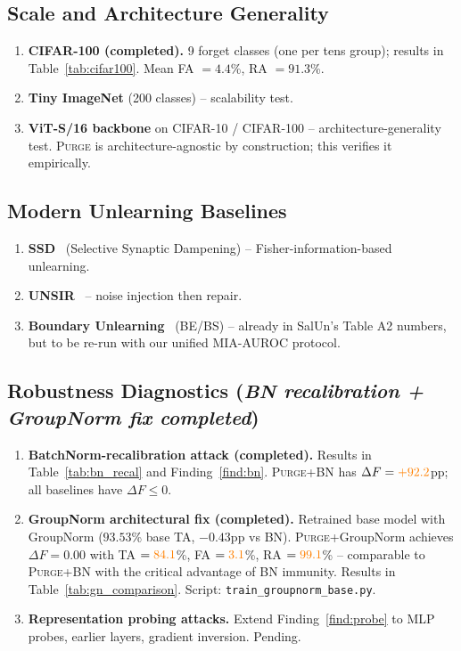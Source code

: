 \documentclass{article}
\newcommand{\ours}{\textsc{Purge}}
\newcommand{\new}[1]{{\color{orange}#1}}
\begin{document}
{\subsection{Scale and Architecture Generality}
\begin{enumerate}[nosep,leftmargin=*]
\item \new{\textbf{CIFAR-100 (completed).} 9 forget classes (one per tens group); results in Table~\ref{tab:cifar100}. Mean FA $= 4.4$\%, RA $= 91.3$\%.}
\item \textbf{Tiny ImageNet} (200 classes) -- scalability test.
\item \textbf{ViT-S/16 backbone} on CIFAR-10 / CIFAR-100 -- architecture-generality test. \ours{} is architecture-agnostic by construction; this verifies it empirically.
\end{enumerate}

\subsection{Modern Unlearning Baselines}
\begin{enumerate}[nosep,leftmargin=*]
\item \textbf{SSD}~\cite{foster2024ssd} (Selective Synaptic Dampening) -- Fisher-information-based unlearning.
\item \textbf{UNSIR}~\cite{tarun2024unsir} -- noise injection then repair.
\item \textbf{Boundary Unlearning}~\cite{chen2023boundary} (BE/BS) -- already in SalUn's Table A2 numbers, but to be re-run with our unified MIA-AUROC protocol.
\end{enumerate}

\subsection{Robustness Diagnostics (\emph{BN recalibration + GroupNorm fix completed})}
\begin{enumerate}[nosep,leftmargin=*]
\item \textbf{BatchNorm-recalibration attack (completed).} Results in Table~\ref{tab:bn_recal} and Finding~\ref{find:bn}. \ours{}+BN has $\Delta F = \new{+92.2}$pp; all baselines have $\Delta F \le 0$.
\item \textbf{GroupNorm architectural fix (completed).} Retrained base model with GroupNorm ($93.53$\% base TA, $-0.43$pp vs BN). \ours{}+GroupNorm achieves $\Delta F = 0.00$ with TA $= \new{84.1}$\%, FA $= \new{3.1}$\%, RA $= \new{99.1}$\% -- \new{comparable to} \ours{}+BN \new{with the critical advantage of BN immunity}. Results in Table~\ref{tab:gn_comparison}. Script: \texttt{train\_groupnorm\_base.py}.
\item \textbf{Representation probing attacks.} Extend Finding~\ref{find:probe} to MLP probes, earlier layers, gradient inversion. Pending.
\end{enumerate}

}
\end{document}
